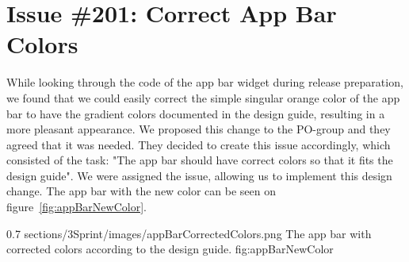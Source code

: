 \section{Issue \#201: Correct App Bar Colors}
While looking through the code of the app bar widget during release preparation, we found that we could easily correct the simple singular orange color of the app bar to have the gradient colors documented in the design guide, resulting in a more pleasant appearance. We proposed this change to the PO-group and they agreed that it was needed. They decided to create this issue accordingly, which consisted of the task: "The app bar should have correct colors so that it fits the design guide". We were assigned the issue, allowing us to implement this design change. The app bar with the new color can be seen on figure~\ref{fig:appBarNewColor}.

        {0.7} %
        {sections/3Sprint/images/appBarCorrectedColors.png} %
        {The app bar with corrected colors according to the design guide.} %
        {fig:appBarNewColor} %